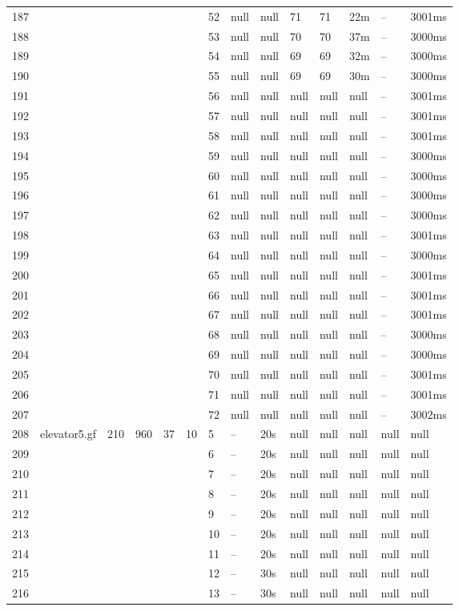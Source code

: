 \documentclass{article}
\begin{document}
\begin{longtable}{|l |l |l |l |l |l |l |l |l |l |l |l |l |l |}
187&&&&&&52&null&null&71&71&22m&--&3001ms\\
188&&&&&&53&null&null&70&70&37m&--&3000ms\\
189&&&&&&54&null&null&69&69&32m&--&3000ms\\
190&&&&&&55&null&null&69&69&30m&--&3000ms\\
191&&&&&&56&null&null&null&null&null&--&3001ms\\
192&&&&&&57&null&null&null&null&null&--&3001ms\\
193&&&&&&58&null&null&null&null&null&--&3001ms\\
194&&&&&&59&null&null&null&null&null&--&3000ms\\
195&&&&&&60&null&null&null&null&null&--&3000ms\\
196&&&&&&61&null&null&null&null&null&--&3000ms\\
197&&&&&&62&null&null&null&null&null&--&3000ms\\
198&&&&&&63&null&null&null&null&null&--&3001ms\\
199&&&&&&64&null&null&null&null&null&--&3000ms\\
200&&&&&&65&null&null&null&null&null&--&3001ms\\
201&&&&&&66&null&null&null&null&null&--&3001ms\\
202&&&&&&67&null&null&null&null&null&--&3001ms\\
203&&&&&&68&null&null&null&null&null&--&3000ms\\
204&&&&&&69&null&null&null&null&null&--&3000ms\\
205&&&&&&70&null&null&null&null&null&--&3001ms\\
206&&&&&&71&null&null&null&null&null&--&3001ms\\
207&&&&&&72&null&null&null&null&null&--&3002ms\\
208&elevator5.gf&210&960&37&10&5&--&20s&null&null&null&null&null\\
209&&&&&&6&--&20s&null&null&null&null&null\\
210&&&&&&7&--&20s&null&null&null&null&null\\
211&&&&&&8&--&20s&null&null&null&null&null\\
212&&&&&&9&--&20s&null&null&null&null&null\\
213&&&&&&10&--&20s&null&null&null&null&null\\
214&&&&&&11&--&20s&null&null&null&null&null\\
215&&&&&&12&--&30s&null&null&null&null&null\\
216&&&&&&13&--&30s&null&null&null&null&null\\

\end{longtable}
\end{document}
